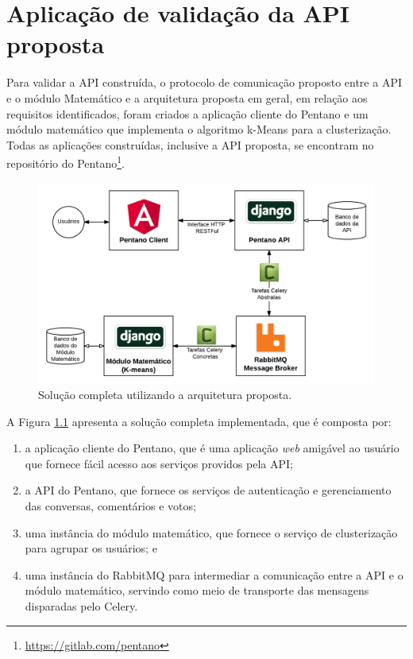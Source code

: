 \chapter{Aplicação de validação da API proposta} \label{cap:aplicacao_exemplo}

  Para validar a API construída, o protocolo de comunicação proposto entre a API e o módulo Matemático
  e a arquitetura proposta em geral, em relação aos requisitos identificados,
  foram criados a aplicação cliente do Pentano e um módulo matemático que implementa o algoritmo k-Means para a clusterização.
  Todas as aplicações construídas, inclusive a API proposta, se encontram no repositório do Pentano\footnote{\href{https://gitlab.com/pentano}{https://gitlab.com/pentano}}.
  
  \begin{figure}[h!]
    \centering
    \includegraphics[scale=0.4]{figuras/whole_solution.png}
    \caption{Solução completa utilizando a arquitetura proposta.}
    \label{fig:whole_solution}
  \end{figure}
  
  A Figura \ref{fig:whole_solution} apresenta a solução completa implementada, que
  é composta por:
  
  \begin{enumerate}
      \item a aplicação cliente do Pentano, que é uma aplicação \textit{web} amigável ao usuário que fornece 
      fácil acesso aos serviços providos pela API;
      \item a API do Pentano, que fornece os serviços de autenticação e gerenciamento das conversas, comentários e votos; 
      \item uma instância do módulo matemático,
	  que fornece o serviço de clusterização para agrupar os usuários; e
      \item uma instância do RabbitMQ para
	  intermediar a comunicação entre a API e o módulo matemático, servindo como meio de transporte das
	  mensagens disparadas pelo Celery.
	  
  \end{enumerate}


